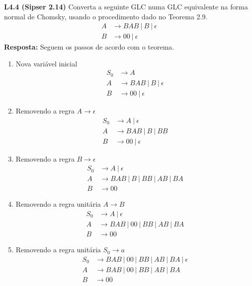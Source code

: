 
\noindent \textbf{L4.4 (Sipser 2.14)} Converta a seguinte GLC numa GLC equivalente na forma normal de Chomsky,
usando o procedimento dado no Teorema 2.9.
\begin{align*}
    A &\rightarrow BAB \ |\ B \ |\ \epsilon \\
    B &\rightarrow 00 \ |\ \epsilon
\end{align*}
\textbf{Resposta: } Seguem os passos de acordo com o teorema.
\begin{enumerate}
    \item Nova variável inicial
    \begin{align*}
        S_0 &\rightarrow A \\
        A &\rightarrow BAB \ |\ B \ |\ \epsilon \\
        B &\rightarrow 00 \ |\ \epsilon
    \end{align*}

    \item Removendo a regra $A \rightarrow \epsilon$
    \begin{align*}
        S_0 &\rightarrow A \ |\ \epsilon \\
        A &\rightarrow BAB \ |\ B \ |\ BB \\
        B &\rightarrow 00 \ |\ \epsilon
    \end{align*}

    \item Removendo a regra $B \rightarrow \epsilon$
    \begin{align*}
        S_0 &\rightarrow A \ |\ \epsilon \\
        A &\rightarrow BAB \ |\ B \ |\ BB \ |\ AB \ |\ BA \\
        B &\rightarrow 00
    \end{align*}

    \item Removendo a regra unitária $A \rightarrow B$
    \begin{align*}
        S_0 &\rightarrow A \ |\ \epsilon \\
        A &\rightarrow BAB \ |\ 00 \ |\ BB \ |\ AB \ |\ BA \\
        B &\rightarrow 00
    \end{align*}

    \item Removendo a regra unitária $S_0 \rightarrow a$
    \begin{align*}
        S_0 &\rightarrow BAB \ |\ 00 \ |\ BB \ |\ AB \ |\ BA  \ |\ \epsilon \\
        A &\rightarrow BAB \ |\ 00 \ |\ BB \ |\ AB \ |\ BA \\
        B &\rightarrow 00
    \end{align*}


\end{enumerate}
